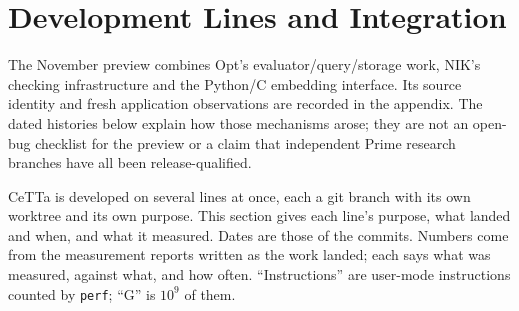 \documentclass[11pt]{article}
\newcommand{\code}[1]{\texttt{#1}}
\newcommand{\CeTTa}{\textup{CeTTa}}
\begin{document}
\section{Development Lines and Integration}
\label{sec:lines}

The November preview combines Opt's evaluator/query/storage work, NIK's
checking infrastructure and the Python/C embedding interface.  Its source
identity and fresh application observations are recorded in the appendix.
The dated histories below explain how those mechanisms arose; they are not
an open-bug checklist for the preview or a claim that independent Prime
research branches have all been release-qualified.

\CeTTa{} is developed on several lines at once, each a git branch with its
own worktree and its own purpose.  This section gives each line's purpose,
what landed and when, and what it measured.  Dates are those of the commits.
Numbers come from the measurement reports written as the work landed; each
says what was measured, against what, and how often.  ``Instructions'' are
user-mode instructions counted by \code{perf}; ``G'' is $10^9$ of them.
\end{document}
